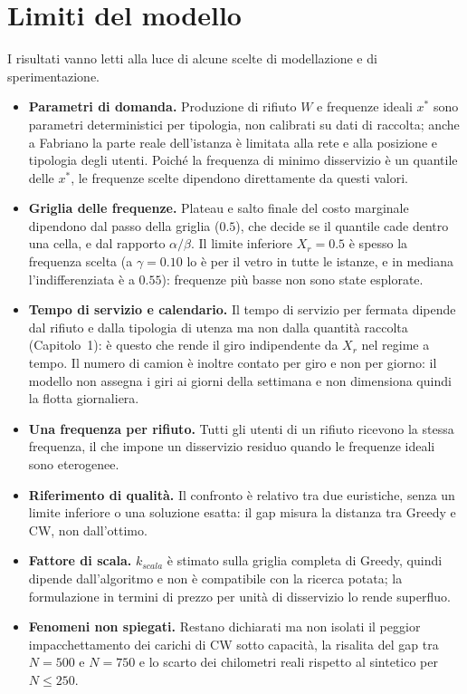 \section*{Limiti del modello}

I risultati vanno letti alla luce di alcune scelte di modellazione e di sperimentazione.

\begin{itemize}
	\item \textbf{Parametri di domanda.} Produzione di rifiuto $W$ e frequenze ideali $x^*$ sono parametri deterministici per tipologia, non calibrati su dati di raccolta; anche a Fabriano la parte reale dell'istanza è limitata alla rete e alla posizione e tipologia degli utenti. Poiché la frequenza di minimo disservizio è un quantile delle $x^*$, le frequenze scelte dipendono direttamente da questi valori.
	\item \textbf{Griglia delle frequenze.} Plateau e salto finale del costo marginale dipendono dal passo della griglia ($0.5$), che decide se il quantile cade dentro una cella, e dal rapporto $\alpha/\beta$. Il limite inferiore $X_r=0.5$ è spesso la frequenza scelta (a $\gamma=0.10$ lo è per il vetro in tutte le istanze, e in mediana l'indifferenziata è a $0.55$): frequenze più basse non sono state esplorate.
	\item \textbf{Tempo di servizio e calendario.} Il tempo di servizio per fermata dipende dal rifiuto e dalla tipologia di utenza ma non dalla quantità raccolta (Capitolo~1): è questo che rende il giro indipendente da $X_r$ nel regime a tempo. Il numero di camion è inoltre contato per giro e non per giorno: il modello non assegna i giri ai giorni della settimana e non dimensiona quindi la flotta giornaliera.
	\item \textbf{Una frequenza per rifiuto.} Tutti gli utenti di un rifiuto ricevono la stessa frequenza, il che impone un disservizio residuo quando le frequenze ideali sono eterogenee.
	\item \textbf{Riferimento di qualità.} Il confronto è relativo tra due euristiche, senza un limite inferiore o una soluzione esatta: il gap misura la distanza tra Greedy e CW, non dall'ottimo.
	\item \textbf{Fattore di scala.} $k_{scala}$ è stimato sulla griglia completa di Greedy, quindi dipende dall'algoritmo e non è compatibile con la ricerca potata; la formulazione in termini di prezzo per unità di disservizio lo rende superfluo.
	\item \textbf{Fenomeni non spiegati.} Restano dichiarati ma non isolati il peggior impacchettamento dei carichi di CW sotto capacità, la risalita del gap tra $N=500$ e $N=750$ e lo scarto dei chilometri reali rispetto al sintetico per $N\le250$.
\end{itemize}

